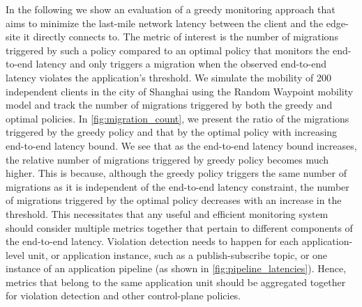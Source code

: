 \par In the following we show an evaluation of a greedy monitoring approach that aims to minimize the last-mile network latency between the client and the edge-site it directly connects to. The metric of interest is the number of migrations triggered by such a policy compared to an optimal policy that monitors the end-to-end latency and only triggers a migration when the observed end-to-end latency violates the application's threshold. We simulate the mobility of 200 independent clients in the city of Shanghai using the Random Waypoint mobility model and track the number of migrations triggered by both the greedy and optimal policies. In \cref{fig:migration_count}, we present the ratio of the migrations triggered by the greedy policy and that by the optimal policy with increasing end-to-end latency bound. We see that as the end-to-end latency bound increases, the relative number of migrations triggered by greedy policy becomes much higher. This is because, although the greedy policy triggers the same number of migrations as it is independent of the end-to-end latency constraint, the number of migrations triggered by the optimal policy decreases with an increase in the threshold. This necessitates that any useful and efficient monitoring system should consider multiple metrics together that pertain to different components of the end-to-end latency. Violation detection needs to happen for each application-level unit, or application instance, such as a publish-subscribe topic, or one instance of an application pipeline (as shown in \cref{fig:pipeline_latencies}). Hence, metrics that belong to the same application unit should be aggregated together for violation detection and other control-plane policies.

